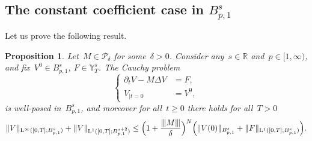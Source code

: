 \documentclass[10pt]{amsart}
\newtheorem{prop}{Proposition}[section]
\theoremstyle{definition}
\newcommand\R{\mathbb{R}}
\renewcommand\L{\mathrm{L}}
\newcommand{\vertiii}[1]{{\vert\kern-0.08em\vert\kern-0.08em\vert #1 \vert\kern-0.08em\vert\kern-0.08em\vert}}
\begin{document}
\subsection{The constant coefficient case in $B^s_{p,1}$}
Let us prove the following result.
\begin{prop}\label{prop:systlinbesov}
Let~$M\in\mathscr{P}_\delta$ for some~$\delta>0$. Consider any~$s \in \R$ and~$p \in [1,\infty)$, and fix~$V^0\in B^s_{p,1}$, $F\in {\mathbb Y}_T^{s}$. The Cauchy problem
\[
\left\{
\begin{aligned}
\partial_t V-M \Delta V &= F,\\
V_{|t=0} &= V^0,
\end{aligned}
\right.
\]
is well-posed in~$B^s_{p,1}$, and moreover for all~$t \geq 0$ there holds for all~$T>0$
\[
\| V \|_{\L^\infty([0,T];B^s_{p,1})} + \| V \|_{\L^1([0,T];B^{s+2}_{p,1})} \leq \Bigl(1+ \frac{ \vertiii{M}}{\delta}\Bigr)^N\Bigl(\| V (0)\|_{B^s_{p,1}} + \| F \|_{\L^1([0,T];B^s_{p,1})} \Bigr).
\]
\end{prop}
\end{document}
